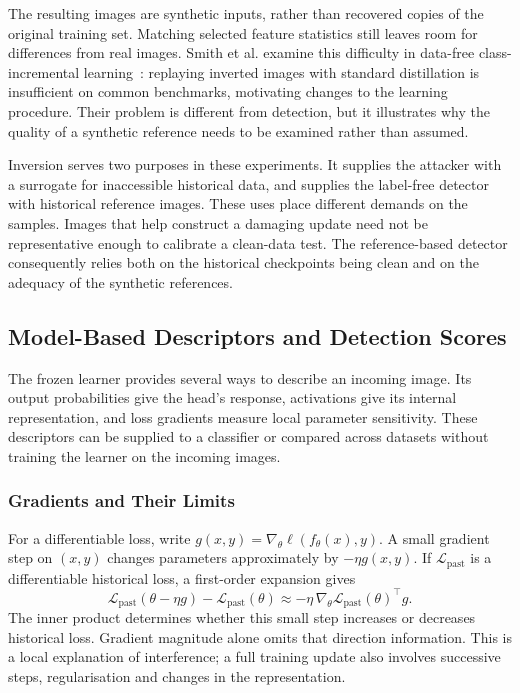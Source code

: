 The resulting images are synthetic inputs, rather than recovered copies of
the original training set. Matching selected feature statistics still leaves
room for differences from real images. Smith et al. examine this difficulty
in data-free class-incremental learning~\cite{smith2021dreaming}: replaying
inverted images with standard distillation is insufficient on common
benchmarks, motivating changes to the learning procedure. Their problem is
different from detection, but it illustrates why the quality of a synthetic
reference needs to be examined rather than assumed.

Inversion serves two purposes in these experiments. It supplies the attacker
with a surrogate for inaccessible historical data, and supplies the
label-free detector with historical reference images. These uses place
different demands on the samples. Images that help construct a damaging
update need not be representative enough to calibrate a clean-data test.
The reference-based detector consequently relies both on the historical
checkpoints being clean and on the adequacy of the synthetic references.

\subsection{Model-Based Descriptors and Detection Scores}
\label{subsec:bg-descriptors}

The frozen learner provides several ways to describe an incoming image.
Its output probabilities give the head's response, activations give its
internal representation, and loss gradients measure local parameter
sensitivity. These descriptors can be supplied to a classifier or compared
across datasets without training the learner on the incoming images.

\subsubsection{Gradients and Their Limits}

For a differentiable loss, write
$g(x,y)=\nabla_\theta\ell(f_\theta(x),y)$. A small gradient step on $(x,y)$
changes parameters approximately by $-\eta g(x,y)$. If
$\mathcal{L}_{\mathrm{past}}$ is a differentiable historical loss, a
first-order expansion gives
\begin{equation}
 \mathcal{L}_{\mathrm{past}}(\theta-\eta g)
 -\mathcal{L}_{\mathrm{past}}(\theta)
 \approx -\eta\,\nabla_\theta\mathcal{L}_{\mathrm{past}}(\theta)^\top g.
 \label{eq:bg-gradient-interference}
\end{equation}
The inner product determines whether this small step increases or decreases
historical loss. Gradient magnitude alone omits that direction information.
This is a local explanation of interference; a full training update also
involves successive steps, regularisation and changes in the representation.

